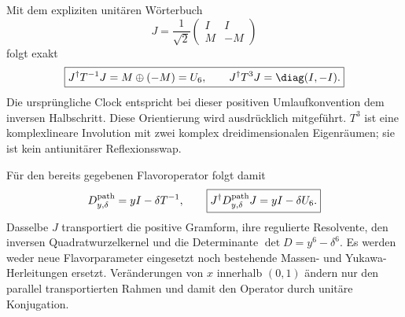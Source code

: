 Mit dem expliziten unitären Wörterbuch
\begin{equation}
J=\frac1{\sqrt2}\begin{pmatrix}I&I\\M&-M\end{pmatrix}
\end{equation}
folgt exakt
\begin{equation}\label{eq:pathclockdictionary}
\boxed{J^\dagger T^{-1}J=M\oplus(-M)=U_6,\qquad
J^\dagger T^3J=\diag(I,-I).}
\end{equation}
Die ursprüngliche Clock entspricht bei dieser positiven Umlaufkonvention dem inversen Halbschritt. Diese Orientierung wird ausdrücklich mitgeführt. $T^3$ ist eine komplexlineare Involution mit zwei komplex dreidimensionalen Eigenräumen; sie ist kein antiunitärer Reflexionsswap.

Für den bereits gegebenen Flavoroperator folgt damit
\begin{equation}
D^{\rm path}_{y,\delta}=yI-\delta T^{-1},\qquad
\boxed{J^\dagger D^{\rm path}_{y,\delta}J=yI-\delta U_6.}
\end{equation}
Dasselbe $J$ transportiert die positive Gramform, ihre regulierte Resolvente, den inversen Quadratwurzelkernel und die Determinante
$\det D=y^6-\delta^6$. Es werden weder neue Flavorparameter eingesetzt noch bestehende Massen- und Yukawa-Herleitungen ersetzt. Veränderungen von $x$ innerhalb $(0,1)$ ändern nur den parallel transportierten Rahmen und damit den Operator durch unitäre Konjugation.

\begin{center}
\end{center}


